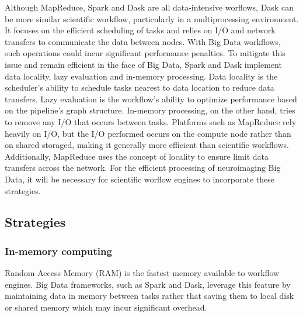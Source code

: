 \documentclass{report}
\newcommand{\weird}[1]{\uwave{#1}}
\begin{document}
            
            Although MapReduce, Spark and Dask are all data-intensive worflows,
            Dask can be more similar \weird{to that of} scientific workflow, 
            particularly in a multiprocessing environment. It focuses on the 
            efficient 
            scheduling of tasks and relies on I/O and network transfers to
            communicate the data between nodes. With Big Data workflows, such
            operations could incur significant performance penalties. 
            To mitigate this issue and remain efficient in the face of
            Big Data, Spark and Dask implement data locality, lazy evaluation 
            and in-memory processing. Data locality is the scheduler's ability
            to schedule tasks nearest to data location to reduce data transfers.
            Lazy evaluation is the workflow's ability to optimize performance
            based on the pipeline's graph structure. In-memory processing, on 
            the other hand, tries to remove any I/O that occurs between tasks. 
            Platforms such as MapReduce rely heavily 
            on I/O, but the 
            I/O performed occurs on the compute node rather than on 
            shared storaged, making it generally more efficient than scientific
            workflows. Additionally, MapReduce uses the concept of 
            locality to ensure limit data transfers across the network.
            For the efficient processing of neuroimaging Big Data, it will be
            necessary for scientific worflow engines to incorporate these 
            strategies.
        

            \subsection{Strategies}
                \subsubsection{In-memory computing}
                    Random Access Memory (RAM) is the fastest memory available
                    to workflow engines. Big Data frameworks, such as Spark and 
                    Dask, leverage this feature by maintaining data in memory 
                    between tasks rather that saving them to local disk or 
                    shared memory which may incur significant overhead.
\end{document}
